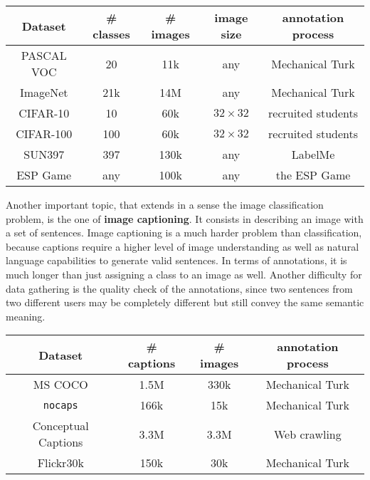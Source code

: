 \vspace{0.5cm}

\begin{center}
	\begin{tabular}{|c|c|c|c|c|}
		\hline
		Dataset & \# classes & \# images & image size & annotation process \\
		\hline
		PASCAL VOC & 20 & 11k & any & Mechanical Turk \\
		ImageNet & 21k & 14M & any & Mechanical Turk \\
		CIFAR-10 & 10 & 60k & $32 \times 32$ & recruited students \\
		CIFAR-100 & 100 & 60k & $32 \times 32$ & recruited students \\
		SUN397 & 397 & 130k & any & LabelMe \\
		ESP Game & any & 100k & any & the ESP Game \\
		\hline
	\end{tabular}
\end{center}
\vspace{0.5cm}

Another important topic, that extends in a sense the image classification problem, is the one of \textbf{image captioning}. It consists in describing an image with a set of sentences. Image captioning is a much harder problem than classification, because captions require a higher level of image understanding as well as natural language capabilities to generate valid sentences. In terms of annotations, it is much longer than just assigning a class to an image as well. Another difficulty for data gathering is the quality check of the annotations, since two sentences from two different users may be completely different but still convey the same semantic meaning. 

\vspace{0.5cm}

\begin{center}
	\begin{tabular}{|c|c|c|c|}
		\hline
		Dataset & \# captions & \# images & annotation process \\
		\hline
		MS COCO \cite{chen2015microsoft} & 1.5M & 330k & Mechanical Turk \\
		\texttt{nocaps} \cite{agrawal2019nocaps} & 166k & 15k & Mechanical Turk \\
		Conceptual Captions \cite{sharma-etal-2018-conceptual} & 3.3M & 3.3M & Web crawling \\
		Flickr30k \cite{flickr30k} & 150k & 30k & Mechanical Turk \\
		\hline
	\end{tabular}
\end{center}
\vspace{0.5cm}

